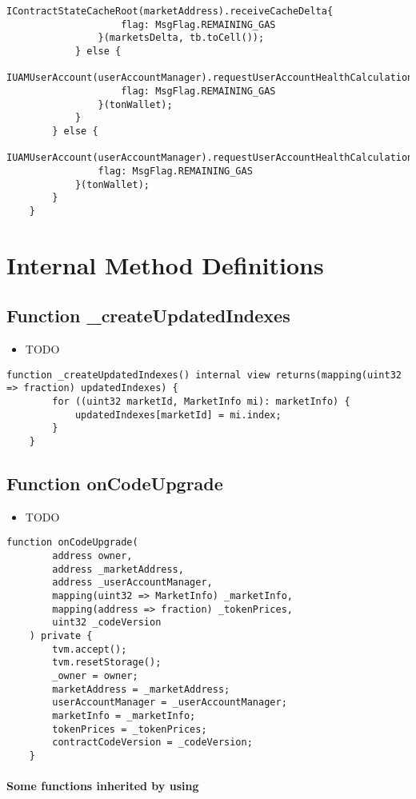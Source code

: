 \begin{lstlisting}[firstnumber=106]
                IContractStateCacheRoot(marketAddress).receiveCacheDelta{
                    flag: MsgFlag.REMAINING_GAS
                }(marketsDelta, tb.toCell());
            } else {
                IUAMUserAccount(userAccountManager).requestUserAccountHealthCalculation{
                    flag: MsgFlag.REMAINING_GAS
                }(tonWallet);
            }
        } else {
            IUAMUserAccount(userAccountManager).requestUserAccountHealthCalculation{
                flag: MsgFlag.REMAINING_GAS
            }(tonWallet);
        }
    }
\end{lstlisting}

\section{Internal Method Definitions}


\subsection{Function \_{}createUpdatedIndexes}

\noindent\begin{itemize}
\item TODO
\end{itemize}

\begin{lstlisting}[firstnumber=100]
    function _createUpdatedIndexes() internal view returns(mapping(uint32 => fraction) updatedIndexes) {
        for ((uint32 marketId, MarketInfo mi): marketInfo) {
            updatedIndexes[marketId] = mi.index;
        }
    }
\end{lstlisting}

\subsection{Function onCodeUpgrade}

\noindent\begin{itemize}
\item TODO
\end{itemize}

\begin{lstlisting}[firstnumber=41]
    function onCodeUpgrade(
        address owner,
        address _marketAddress,
        address _userAccountManager,
        mapping(uint32 => MarketInfo) _marketInfo,
        mapping(address => fraction) _tokenPrices,
        uint32 _codeVersion
    ) private {
        tvm.accept();
        tvm.resetStorage();
        _owner = owner;
        marketAddress = _marketAddress;
        userAccountManager = _userAccountManager;
        marketInfo = _marketInfo;
        tokenPrices = _tokenPrices;
        contractCodeVersion = _codeVersion;
    }
\end{lstlisting}
\paragraph{Some functions inherited by using}

